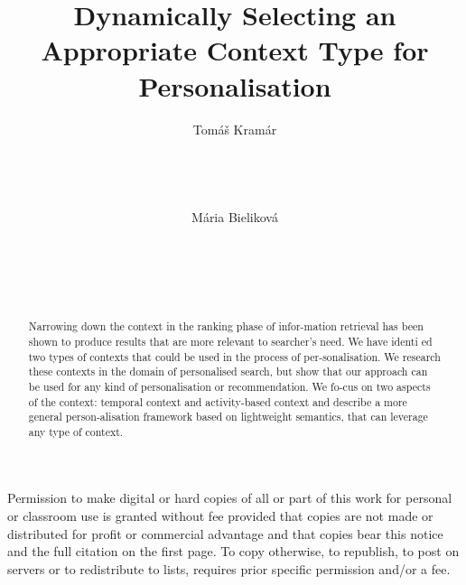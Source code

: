 \documentclass{acm_proc_article-sp} %
\begin{document}
\title{Dynamically Selecting an Appropriate Context Type
for Personalisation}


\author{
\alignauthor
Tomáš Kramár\\
       \\
       \\
       \\
       \\
\alignauthor
Mária Bieliková\\
       \\
       \\
       \\
       \\
}

\maketitle

\begin{abstract}
Narrowing down the context in the ranking phase of infor-mation retrieval has been shown to produce results that are more relevant to searcher's need. We have identi ed two types of contexts that could be used in the process of per-sonalisation. We research these contexts in the domain of personalised search, but show that our approach can be used for any kind of personalisation or recommendation. We fo-cus on two aspects of the context: temporal context and activity-based context and describe a more general person-alisation framework based on lightweight semantics, that can leverage any type of context.
\end{abstract}

\category{H.3.3}{[Information Search and Retrieval}{Information filtering}

\terms{}
Permission to make digital or hard copies of all or part of this work for
personal or classroom use is granted without fee provided that copies are
not made or distributed for profit or commercial advantage and that copies
bear this notice and the full citation on the first page. To copy otherwise, to
republish, to post on servers or to redistribute to lists, requires prior specific
permission and/or a fee.
\end{document}
